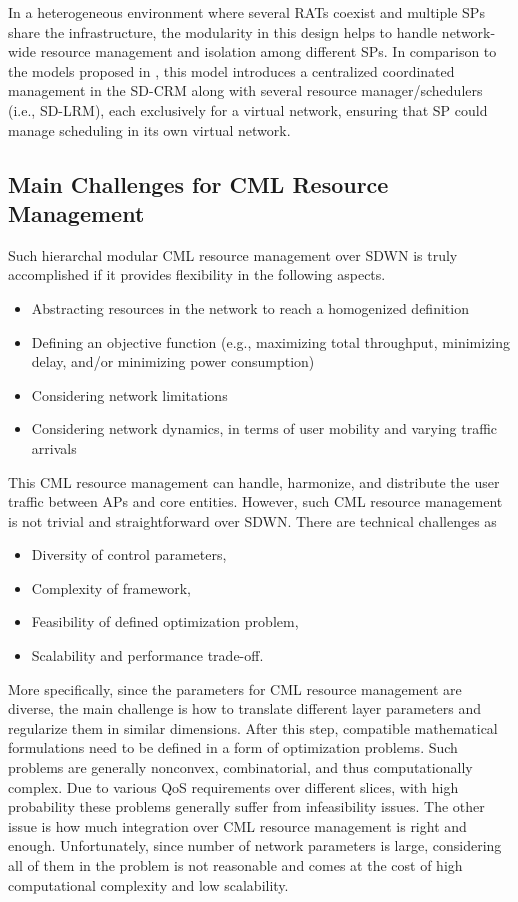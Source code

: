 \documentclass[conference]{IEEEtran}
\begin{document}
In a heterogeneous environment where several RATs coexist and multiple SPs share the infrastructure, the modularity in this design helps to handle network-wide resource management and isolation among different SPs. In comparison to the models proposed in \cite{khatibi2014modelling,caeiro2015ondemand}, this model introduces a centralized coordinated management in the SD-CRM along with several resource manager/schedulers (i.e., SD-LRM), each exclusively for a virtual network, ensuring that SP could manage scheduling in its own virtual network.

\subsection{Main Challenges for CML Resource Management}

   
Such hierarchal modular CML resource management over SDWN is truly accomplished if it provides flexibility in the following aspects.
\begin{itemize}
	\item Abstracting resources in the network to reach a homogenized definition 
	\item Defining an objective function (e.g., maximizing total throughput, minimizing delay, and/or minimizing power consumption)
	\item Considering network limitations
	\item Considering network dynamics, in terms of user mobility and varying traffic arrivals 
\end{itemize}

This CML resource management can handle, harmonize, and distribute the user traffic between APs and core entities. However, such CML resource management is not trivial and straightforward over SDWN. There are technical challenges as   
\begin{itemize}
	\item Diversity of control parameters, 	
	\item Complexity of framework,
	\item Feasibility of defined optimization problem,
	\item Scalability and performance trade-off.
\end{itemize}

 More specifically, since the parameters for CML resource management are diverse, the main challenge is how to translate different layer parameters and regularize them in similar dimensions. After this step, compatible mathematical formulations need to be defined in a form of optimization problems. Such problems are generally nonconvex, combinatorial, and thus computationally complex. Due to various QoS requirements over different slices, with high probability these problems generally suffer from infeasibility issues. The other issue is how much integration over CML resource management is right and enough. Unfortunately, since number of network parameters is large, considering all of them in the problem is not reasonable and comes at the cost of high computational complexity and low scalability.
\end{document}
